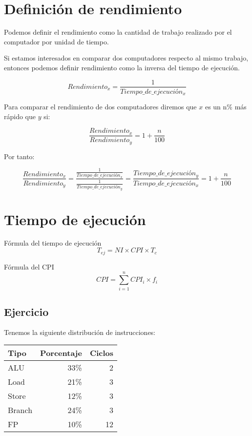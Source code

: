 \documentclass[12pt,onecolumn]{memoir}
\begin{document}
\section{Definición de rendimiento}

Podemos definir el rendimiento como la cantidad de trabajo realizado
por el computador por unidad de tiempo.

Si estamos interesados en comparar dos computadores respecto al mismo
trabajo, entonces podemos definir rendimiento como la inversa del
tiempo de ejecución.

\[ Rendimiento_{x} = \frac{1}{Tiempo\_de\_ejecución_{x}} \]

Para comparar el rendimiento de dos computadores diremos que $x$ es un
n\% más rápido que $y$ si:

\[ \frac{Rendimiento_{x}}{Rendimiento_{y}} = 1 + \frac{n}{100} \]

Por tanto:

\[ \frac{Rendimiento_{x}}{Rendimiento_{y}} =
\frac{\frac{1}{Tiempo\_de\_ejecución_{x}}}{\frac{1}{Tiempo\_de\_ejecución_{y}}}
= \frac{Tiempo\_de\_ejecución_{y}}{Tiempo\_de\_ejecución_{x}} = 1 + \frac{n}{100}\]


\section{Tiempo de ejecución}

Fórmula del tiempo de ejecución \[ T_{ej} = NI \times CPI \times
T_{c} \]

Fórmula del CPI \[ CPI = \sum_{i=1}^{n} CPI_i \times f_i \]

\subsection{Ejercicio}

Tenemos la siguiente distribución de instrucciones:

\begin{center}
\begin{tabular}{lrr}
\hline
{\textbf{Tipo}} & {\textbf{Porcentaje}} & {\textbf{Ciclos}} \\
\hline
ALU & 33\% & 2 \\
Load & 21\% & 3 \\
Store & 12\% & 3 \\
Branch & 24\% & 3 \\
FP & 10\% & 12 \\
\hline
\end{tabular}
\end{center}
\end{document}
